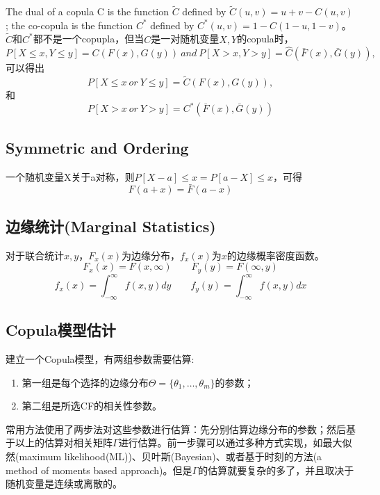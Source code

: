 The \textcolor[rgb]{1,0,0}{dual of a copula C} is the function $\tilde{C}$ defined by $\tilde{C}(u,v) = u+v-C(u,v)$; the co-copula is the function $C^*$ defined by $C^*(u,v) = 1-C(1-u,1-v)$。$\tilde{C}$和$C^*$都不是一个copupla，但当$C$是一对随机变量$X,Y$的copula时，
\begin{equation*}
    P[X \leq x, Y\leq y] = C(F(x),G(y)) \ and \ P[X>x,Y>y] = \hat{C}(\bar{F}(x),\bar{G}(y)),
\end{equation*}
可以得出
\begin{equation}
    P[X\leq x \ or\ Y\leq y] = \tilde{C}(F(x),G(y)),
    \label{eq-dual}
\end{equation}
和
\begin{equation}
    P[X>x \ or \ Y>y] = C^*(\bar{F}(x),\bar{G}(y))
    \label{eq-cocopula}
\end{equation}



\subsection{Symmetric and Ordering}
一个随机变量X关于a对称，则$P[X-a]\leq x = P[a-X]\leq x$，可得
\begin{equation}
    F(a+x) = \bar{F}(a-x)
    \label{eq-symmetricF}
\end{equation}






\subsection{边缘统计(Marginal Statistics)}
对于联合统计$x,y$，$F_x(x)$为边缘分布，$f_x(x)$为$x$的边缘概率密度函数。
\begin{equation}
    F_x(x) = F(x,\infty) \qquad F_y(y) = F(\infty,y)
    \label{eq0.1}
\end{equation}
\begin{equation}
    f_x(x) = \int_{-\infty}^{\infty} f(x,y) dy \qquad f_y(y) = \int_{-\infty}^{\infty} f(x,y) dx
    \label{eq0.2}
\end{equation}
\subsection{Copula模型估计}
建立一个Copula模型，有两组参数需要估算\cite{Smith2009}:
\begin{enumerate}
    \item 第一组是每个选择的边缘分布$\Theta = \{\theta_1,\dots,\theta_m\}$的参数；
    \item 第二组是所选CF的相关性参数。
\end{enumerate}
常用方法使用了两步法对这些参数进行估算：先分别估算边缘分布的参数；然后基于以上的估算对相关矩阵$\Gamma$进行估算。前一步骤可以通过多种方式实现，如最大似然(maximum likelihood(ML))、贝叶斯(Bayesian)、或者基于时刻的方法(a method of moments based approach)。但是$\Gamma$的估算就要复杂的多了，并且取决于随机变量是连续或离散的。

